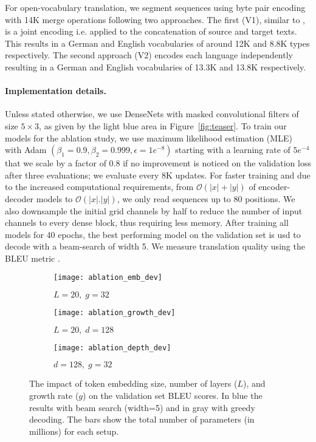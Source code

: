 \documentclass[11pt,a4paper]{article}
\def\fig#1{Figure~\ref{fig:#1}}
\begin{document}
For open-vocabulary translation, we segment sequences using byte pair encoding \cite{sennrich16acl} with 14K merge operations following two approaches. The first (V1), similar to \citet{edunov18naacl, deng18arxiv}, is a joint encoding i.e. applied to the concatenation of source and target texts. This results in a German and English vocabularies of around 12K and 8.8K types respectively. 
The second approach (V2) encodes each language independently resulting in a German and English vocabularies of 13.3K and 13.8K respectively.

\paragraph{Implementation details.}
Unless stated otherwise, we use DenseNets with masked convolutional filters of size $5\!\times\!3$, as given by the light blue area in \fig{teaser}.
To train our models for the ablation study, we use maximum likelihood estimation (MLE) with Adam $(\beta_1=0.9, \beta_2=0.999, \epsilon=1e^{-8})$ starting with a learning rate of $5e^{-4}$ that we scale by a factor of 0.8 if no improvement is noticed on the validation loss after three evaluations; we evaluate every 8K updates.
For faster training and due to the increased computational requirements, from $\mathcal O(|x|+|y|)$ of encoder-decoder models to $\mathcal O(|x|.|y|)$, we only read sequences up to 80 positions. We also downsample the initial grid channels by half to reduce the number of input channels to every dense block, thus requiring less memory.
After training all models for 40 epochs, the best performing model on the validation set is usd to decode with a beam-search of width 5. We measure translation quality using the BLEU metric \cite{papineni02acl}.
\begin{figure*}[!t]
\begin{center}
\begin{subfigure}{0.32\textwidth}
    \caption{\label{fig:ablation:emb}$L=20,\; g=32$ } 
\texttt{[image: ablation\_emb\_dev]}
\end{subfigure}
\begin{subfigure}{0.32\textwidth}
    \caption{\label{fig:ablation:growth}$L=20,\; d=128$}
\texttt{[image: ablation\_growth\_dev]}
\end{subfigure}
\begin{subfigure}{0.32\textwidth}
\caption{\label{fig:ablation:depth}$d=128,\; g=32$ } 
\texttt{[image: ablation\_depth\_dev]} 
\end{subfigure}
\end{center}
\caption{The impact of token embedding size, number of layers ($L$), and growth rate ($g$) on the validation set BLEU scores. 
    In blue the results with beam search (width=5) and in gray with greedy decoding. The bars show the total number of parameters (in millions) for each setup.
}
\label{fig:ablation}
\end{figure*}
\end{document}

